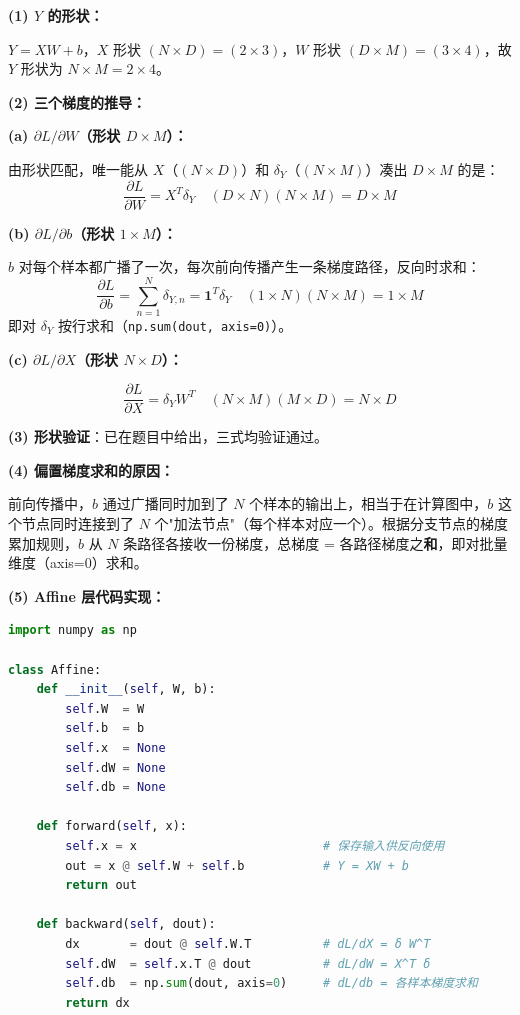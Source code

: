 \documentclass[a4paper,11pt]{ctexart}
\begin{document}
\begin{solutionbox}[参考答案与详细解析]
    \textbf{(1) $Y$ 的形状：}

    $Y = XW + b$，$X$ 形状 $(N \times D) = (2 \times 3)$，$W$ 形状 $(D \times M) = (3 \times 4)$，故 $Y$ 形状为 $\boxed{N \times M = 2 \times 4}$。

    \textbf{(2) 三个梯度的推导：}

    \textbf{(a) $\partial L / \partial W$（形状 $D \times M$）：}

    由形状匹配，唯一能从 $X$（$(N \times D)$）和 $\delta_Y$（$(N \times M)$）凑出 $D \times M$ 的是：
    \[
    \frac{\partial L}{\partial W} = X^T \delta_Y \quad (D \times N)(N \times M) = D \times M
    \]

    \textbf{(b) $\partial L / \partial b$（形状 $1 \times M$）：}

    $b$ 对每个样本都广播了一次，每次前向传播产生一条梯度路径，反向时求和：
    \[
    \frac{\partial L}{\partial b} = \sum_{n=1}^{N} \delta_{Y,n} = \mathbf{1}^T \delta_Y \quad (1 \times N)(N \times M) = 1 \times M
    \]
    即对 $\delta_Y$ 按行求和（\texttt{np.sum(dout, axis=0)}）。

    \textbf{(c) $\partial L / \partial X$（形状 $N \times D$）：}

    \[
    \frac{\partial L}{\partial X} = \delta_Y W^T \quad (N \times M)(M \times D) = N \times D
    \]

    \textbf{(3) 形状验证}：已在题目中给出，三式均验证通过。\checkmark

    \textbf{(4) 偏置梯度求和的原因：}

    前向传播中，$b$ 通过广播同时加到了 $N$ 个样本的输出上，相当于在计算图中，$b$ 这个节点同时连接到了 $N$ 个"加法节点"（每个样本对应一个）。根据分支节点的梯度累加规则，$b$ 从 $N$ 条路径各接收一份梯度，总梯度 = 各路径梯度之\textbf{和}，即对批量维度（axis=0）求和。

    \textbf{(5) Affine 层代码实现：}

    \begin{lstlisting}[language=Python]
import numpy as np

class Affine:
    def __init__(self, W, b):
        self.W  = W
        self.b  = b
        self.x  = None
        self.dW = None
        self.db = None

    def forward(self, x):
        self.x = x                          # 保存输入供反向使用
        out = x @ self.W + self.b           # Y = XW + b
        return out

    def backward(self, dout):
        dx       = dout @ self.W.T          # dL/dX = δ W^T
        self.dW  = self.x.T @ dout          # dL/dW = X^T δ
        self.db  = np.sum(dout, axis=0)     # dL/db = 各样本梯度求和
        return dx
    \end{lstlisting}
\end{solutionbox}
\end{document}
